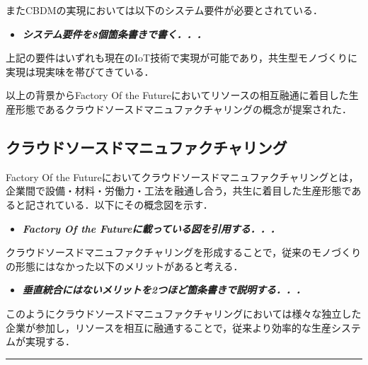またCBDMの実現においては以下のシステム要件が必要とされている\cite{WU2015}．

\begin{itemize}
\tightlist
\item
  \textbf{\emph{システム要件を8個箇条書きで書く．．．}}
\end{itemize}

上記の要件はいずれも現在のIoT技術で実現が可能であり，共生型モノづくりに実現は現実味を帯びてきている．

以上の背景からFactory Of the
Futureにおいてリソースの相互融通に着目した生産形態であるクラウドソースドマニュファクチャリングの概念が提案された\cite{Factory2015}．

\hypertarget{ux30afux30e9ux30a6ux30c9ux30bdux30fcux30b9ux30c9ux30deux30cbux30e5ux30d5ux30a1ux30afux30c1ux30e3ux30eaux30f3ux30b0}{%
\subsection{クラウドソースドマニュファクチャリング}\label{ux30afux30e9ux30a6ux30c9ux30bdux30fcux30b9ux30c9ux30deux30cbux30e5ux30d5ux30a1ux30afux30c1ux30e3ux30eaux30f3ux30b0}}

Factory Of the
Futureにおいてクラウドソースドマニュファクチャリングとは，企業間で設備・材料・労働力・工法を融通し合う，共生に着目した生産形態であると記されている\cite{Factory2015}．以下にその概念図を示す．

\begin{itemize}
\tightlist
\item
  \textbf{\emph{Factory Of the Futureに載っている図を引用する．．．}}
\end{itemize}

クラウドソースドマニュファクチャリングを形成することで，従来のモノづくりの形態にはなかった以下のメリットがあると考える\cite{KATSUMURA2016}．

\begin{itemize}
\tightlist
\item
  \textbf{\emph{垂直統合にはないメリットを2つほど箇条書きで説明する．．．}}
\end{itemize}

このようにクラウドソースドマニュファクチャリングにおいては様々な独立した企業が参加し，リソースを相互に融通することで，従来より効率的な生産システムが実現する．

\begin{center}\rule{1.0\linewidth}{0.5pt}\end{center}

